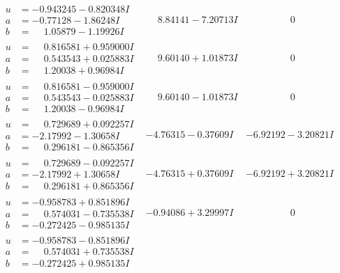 \documentclass[1p]{elsarticle_modified}
\theoremstyle{definition}
\begin{document}
$$\begin{array}{c|c|c}
\begin{aligned}
u &= -0.943245 - 0.820348 I \\
a &= -0.77128 - 1.86248 I \\
b &= \phantom{-}1.05879 - 1.19926 I\end{aligned}
 & \phantom{-}8.84141 - 7.20713 I & \phantom{-0.000000 } 0 \\ \hline\begin{aligned}
u &= \phantom{-}0.816581 + 0.959000 I \\
a &= \phantom{-}0.543543 + 0.025883 I \\
b &= \phantom{-}1.20038 + 0.96984 I\end{aligned}
 & \phantom{-}9.60140 + 1.01873 I & \phantom{-0.000000 } 0 \\ \hline\begin{aligned}
u &= \phantom{-}0.816581 - 0.959000 I \\
a &= \phantom{-}0.543543 - 0.025883 I \\
b &= \phantom{-}1.20038 - 0.96984 I\end{aligned}
 & \phantom{-}9.60140 - 1.01873 I & \phantom{-0.000000 } 0 \\ \hline\begin{aligned}
u &= \phantom{-}0.729689 + 0.092257 I \\
a &= -2.17992 - 1.30658 I \\
b &= \phantom{-}0.296181 - 0.865356 I\end{aligned}
 & -4.76315 - 0.37609 I & -6.92192 - 3.20821 I \\ \hline\begin{aligned}
u &= \phantom{-}0.729689 - 0.092257 I \\
a &= -2.17992 + 1.30658 I \\
b &= \phantom{-}0.296181 + 0.865356 I\end{aligned}
 & -4.76315 + 0.37609 I & -6.92192 + 3.20821 I \\ \hline\begin{aligned}
u &= -0.958783 + 0.851896 I \\
a &= \phantom{-}0.574031 - 0.735538 I \\
b &= -0.272425 - 0.985135 I\end{aligned}
 & -0.94086 + 3.29997 I & \phantom{-0.000000 } 0 \\ \hline\begin{aligned}
u &= -0.958783 - 0.851896 I \\
a &= \phantom{-}0.574031 + 0.735538 I \\
b &= -0.272425 + 0.985135 I\end{aligned}

\end{array}$$
\end{document}

